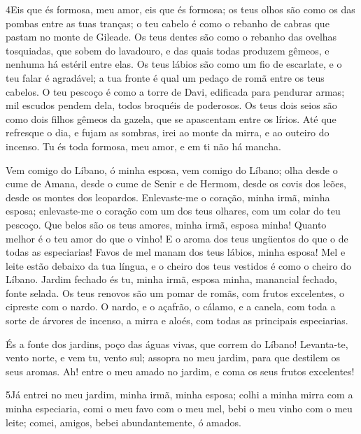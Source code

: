 \medskip

\lettrine{4} Eis que és formosa, meu amor, eis que és formosa;
os teus olhos são como os das pombas entre as tuas tranças; o teu
cabelo é como o rebanho de cabras que pastam no monte de Gileade.
Os teus dentes são como o rebanho das ovelhas tosquiadas, que
sobem do lavadouro, e das quais todas produzem gêmeos, e nenhuma há
estéril entre elas. Os teus lábios são como um fio de escarlate,
e o teu falar é agradável; a tua fronte é qual um pedaço de romã
entre os teus cabelos. O teu pescoço é como a torre de Davi,
edificada para pendurar armas; mil escudos pendem dela, todos
broquéis de poderosos. Os teus dois seios são como dois filhos
gêmeos da gazela, que se apascentam entre os lírios. Até que
refresque o dia, e fujam as sombras, irei ao monte da mirra, e ao
outeiro do incenso. Tu és toda formosa, meu amor, e em ti não há
mancha.

Vem comigo do Líbano, ó minha esposa, vem comigo do Líbano; olha
desde o cume de Amana, desde o cume de Senir e de Hermom, desde os
covis dos leões, desde os montes dos leopardos. Enlevaste-me o
coração, minha irmã, minha esposa; enlevaste-me o coração com um dos
teus olhares, com um colar do teu pescoço. Que belos são os
teus amores, minha irmã, esposa minha! Quanto melhor é o teu amor do
que o vinho! E o aroma dos teus ungüentos do que o de todas as
especiarias! Favos de mel manam dos teus lábios, minha
esposa! Mel e leite estão debaixo da tua língua, e o cheiro dos teus
vestidos é como o cheiro do Líbano. Jardim fechado és tu,
minha irmã, esposa minha, manancial fechado, fonte selada. Os
teus renovos são um pomar de romãs, com frutos excelentes, o
cipreste com o nardo. O nardo, e o açafrão, o cálamo, e a
canela, com toda a sorte de árvores de incenso, a mirra e aloés, com
todas as principais especiarias.

És a fonte dos jardins, poço das águas vivas, que correm do
Líbano! Levanta-te, vento norte, e vem tu, vento sul; assopra
no meu jardim, para que destilem os seus aromas. Ah! entre o meu
amado no jardim, e coma os seus frutos excelentes!

\medskip

\lettrine{5} Já entrei no meu jardim, minha irmã, minha
esposa; colhi a minha mirra com a minha especiaria, comi o meu favo
com o meu mel, bebi o meu vinho com o meu leite; comei, amigos,
bebei abundantemente, ó amados.


